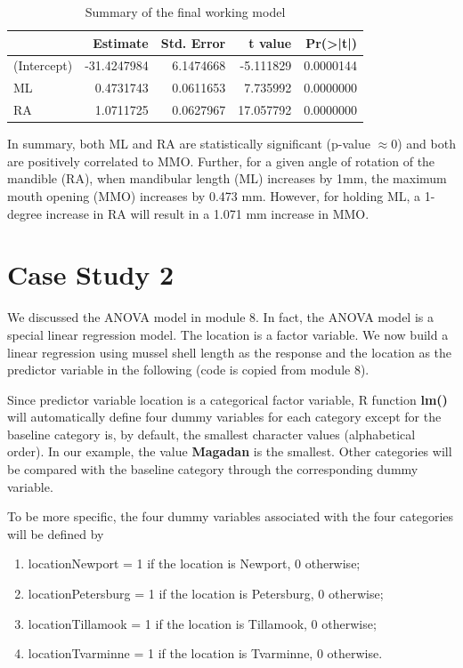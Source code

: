 \documentclass[
]{book}
\begin{document}
\begin{table}

\caption{\label{tab:unnamed-chunk-165}Summary of the final working model}
\centering
\begin{tabular}[t]{l|r|r|r|r}
\hline
  & Estimate & Std. Error & t value & Pr(>|t|)\\
\hline
(Intercept) & -31.4247984 & 6.1474668 & -5.111829 & 0.0000144\\
\hline
ML & 0.4731743 & 0.0611653 & 7.735992 & 0.0000000\\
\hline
RA & 1.0711725 & 0.0627967 & 17.057792 & 0.0000000\\
\hline
\end{tabular}
\end{table}

In summary, both ML and RA are statistically significant (p-value \(\approx 0\)) and both are positively correlated to MMO. Further, for a given angle of rotation of the mandible (RA), when mandibular length (ML) increases by 1mm, the maximum mouth opening (MMO) increases by 0.473 mm. However, for holding ML, a 1-degree increase in RA will result in a 1.071 mm increase in MMO.

\hypertarget{case-study-2}{%
\section{Case Study 2}\label{case-study-2}}

We discussed the ANOVA model in module 8. In fact, the ANOVA model is a special linear regression model. The location is a factor variable. We now build a linear regression using mussel shell length as the response and the location as the predictor variable in the following (code is copied from module 8).

Since predictor variable location is a categorical factor variable, R function \textbf{lm()} will automatically define four dummy variables for each category except for the baseline category is, by default, the smallest character values (alphabetical order). In our example, the value \textbf{Magadan} is the smallest. Other categories will be compared with the baseline category through the corresponding dummy variable.

To be more specific, the four dummy variables associated with the four categories will be defined by

\begin{enumerate}
\def\labelenumi{\arabic{enumi}.}
\item
  locationNewport = 1 if the location is Newport, 0 otherwise;
\item
  locationPetersburg = 1 if the location is Petersburg, 0 otherwise;
\item
  locationTillamook = 1 if the location is Tillamook, 0 otherwise;
\item
  locationTvarminne = 1 if the location is Tvarminne, 0 otherwise.
\end{enumerate}
\end{document}
